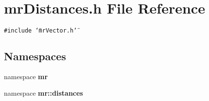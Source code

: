 \section{mr\-Distances.h File Reference}
\label{mrDistances_8h}
{\tt \#include \char`\"{}mr\-Vector.h\char`\"{}}\par
\subsection*{Namespaces}
\begin{CompactItemize}
\item 
namespace {\bf mr}
\item 
namespace {\bf mr::distances}
\end{CompactItemize}

